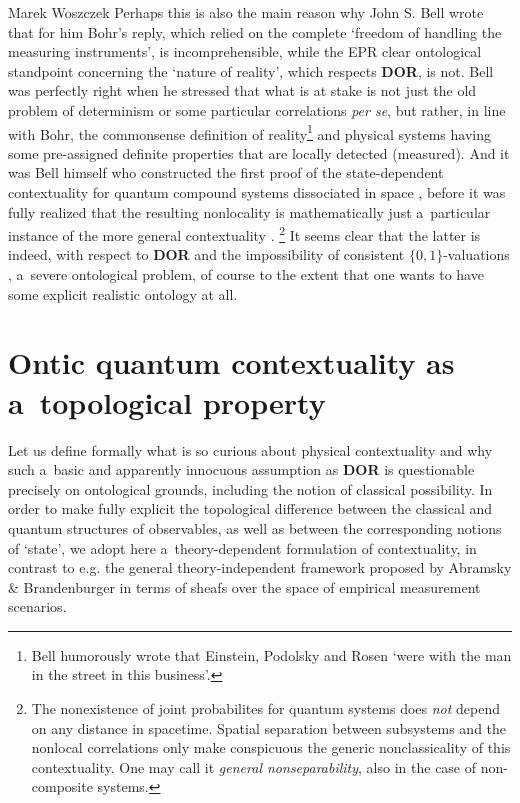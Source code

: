 \begin{artengenv}{Marek Woszczek}
Perhaps this is also the main reason why John S. Bell
\parencite*[][pp.58–59]{bell_bertlmanns_1981} %
 wrote that for him Bohr's reply, which relied on the complete ‘freedom of handling the measuring instruments', is incomprehensible, while the EPR clear ontological standpoint concerning the ‘nature of reality', which respects \textbf{DOR}, is not. Bell was perfectly right when he stressed that what is at stake is not just the old problem of determinism or some particular correlations \textit{per se}, but rather, in line with Bohr, the commonsense definition of reality\footnote{Bell 
\parencite*[][pp.45–46]{bell_bertlmanns_1981} %
 humorously wrote that Einstein, Podolsky and Rosen ‘were with the man in the street in this business'.} and physical systems having some pre-assigned definite properties that are locally detected (measured). And it was Bell himself who constructed the first proof of the state-dependent contextuality for quantum compound systems dissociated in space 
\parencite[][]{bell_einstein-podolsky-rosen_1964}, %
 before it was fully realized that the resulting nonlocality is mathematically just a~particular instance of the more general contextuality 
\parencites[e.g.][]{horodecki_axiomatic_2015}[][]{horodecki_axiomatic_2015}.%
\footnote{The nonexistence of joint probabilites for quantum systems does \textit{not} depend on any distance in spacetime. Spatial separation between subsystems and the nonlocal correlations only make conspicuous the generic nonclassicality of this contextuality. One may call it \textit{general nonseparability}, also in the case of non-composite systems.} It seems clear that the latter is indeed, with respect to \textbf{DOR} and the impossibility of consistent $\{0,1\}$-valuations 
\parencite[][p.699]{bohr_can_1935}, %
 a~severe ontological problem, of course to the extent that one wants to have some explicit realistic ontology at all.

\section{Ontic quantum contextuality as a~topological property}
Let us define formally what is so curious about physical contextuality and why such a~basic and apparently innocuous assumption as \textbf{DOR} is questionable precisely on ontological grounds, including the notion of classical possibility. In order to make fully explicit the topological difference between the classical and quantum structures of observables, as well as between the corresponding notions of ‘state', we adopt here a~theory-dependent formulation of contextuality, in contrast to e.g. the general theory-independent framework proposed by Abramsky \& Brandenburger
\parencite*[][]{abramsky_sheaf-theoretic_2011} %
 in terms of sheafs over the space of empirical measurement scenarios.


\end{artengenv}
